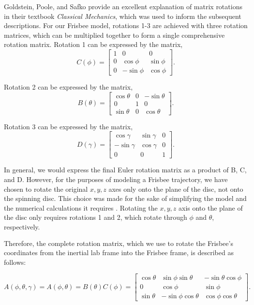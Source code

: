 \documentclass[a4paper,12pt, oneside]{article}
\begin{document}
Goldstein, Poole, and Safko provide an excellent explanation of matrix rotations in their textbook \textit{Classical Mechanics}, which was used to inform the subsequent descriptions. For our Frisbee model, rotations 1-3 are achieved with three rotation matrices, which can be multiplied together to form a single comprehensive rotation matrix. Rotation 1 can be expressed by the matrix,
\begin{equation*}
C(\phi)=\begin{bmatrix}
1 & 0 & 0 \\
0 & \cos\phi & \sin\phi \\
0 & -\sin\phi & \cos\phi
\end{bmatrix}.
\end{equation*}

Rotation 2 can be expressed by the matrix, 
\begin{equation*}
B(\theta)=\begin{bmatrix}
\cos\theta & 0 & -\sin\theta \\
0 & 1 & 0 \\
\sin\theta & 0 & \cos\theta
\end{bmatrix}.
\end{equation*}

Rotation 3 can be expressed by the matrix, 
\begin{equation*}
D(\gamma)=\begin{bmatrix}
\cos\gamma & \sin\gamma & 0 \\
-\sin\gamma & \cos\gamma & 0 \\
0 & 0 & 1
\end{bmatrix}.
\end{equation*}

In general, we would express the final Euler rotation matrix as a product of B, C, and D. However, for the purposes of modeling a Frisbee trajectory, we have chosen to rotate the original $x, y, z$ axes only onto the plane of the disc, not onto the spinning disc. This choice was made for the sake of simplifying the model and the numerical calculations it requires \cite{hubbardandhummel}. Rotating the $x, y, z$ axis onto the plane of the disc only requires rotations 1 and 2, which rotate through $\phi$ and $\theta$, respectively.

Therefore, the complete rotation matrix, which we use to rotate the Frisbee's coordinates from the inertial lab frame into the Frisbee frame, is described as follows:

\begin{equation*}
A(\phi,\theta,\gamma)=A(\phi,\theta)=B(\theta)C(\phi)=\begin{bmatrix}
\cos\theta & \sin\phi\sin\theta & -\sin\theta\cos\phi \\
0 & \cos\phi & \sin\phi \\
\sin\theta & -\sin\phi\cos\theta & \cos\phi\cos\theta
\end{bmatrix}.
\end{equation*}
\end{document}
